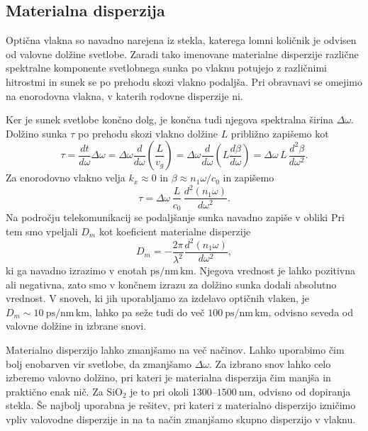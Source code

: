 \subsection*{Materialna disperzija}
Optična vlakna so navadno narejena iz stekla, katerega lomni količnik je odvisen 
od valovne dolžine svetlobe. Zaradi tako imenovane materialne disperzije različne 
spektralne komponente svetlobnega sunka po vlaknu potujejo z različnimi hitrostmi 
in sunek se po prehodu skozi vlakno podaljša. Pri obravnavi 
se omejimo na enorodovna vlakna, v katerih rodovne disperzije ni. 

Ker je sunek svetlobe končno dolg, je končna tudi njegova spektralna širina 
$\Delta \omega$. 
Dolžino sunka $\tau$ po prehodu skozi vlakno dolžine $L$ približno zapišemo kot
\begin{equation}
\tau = \frac{dt}{d\omega}\Delta \omega = 
\Delta \omega \frac{d}{d\omega}\left(\frac{L}{v_g}\right)
= \Delta \omega \frac{d}{d\omega}\left(L \frac{d\beta}{d\omega}\right) =
\Delta \omega\, L\, \frac{d^2 \beta}{d \omega^2}.
\label{dispračun}
\end{equation}
Za enorodovno vlakno velja $k_x \approx 0$ in $\beta \approx n_1 \omega/c_0$ in zapišemo  
\begin{equation}
\tau = \Delta \omega\, \frac{L}{c_0}\,\frac{d^2 (n_1 \omega)}{d \omega^2}.
\end{equation}
Na področju telekomunikacij se podaljšanje sunka navadno zapiše v obliki
Pri tem smo vpeljali $D_m$ kot koeficient materialne disperzije
\begin{equation}
D_m = - \frac{2\pi}{\lambda^2}\frac{d^2(n_1\omega)}{d\omega^2},
\end{equation}
ki ga navadno izrazimo v enotah $\si{\pico\second/\nano\meter\, \kilo\meter}$.
Njegova vrednost je lahko pozitivna ali negativna, zato smo v končnem izrazu za dolžino 
sunka dodali absolutno vrednost. V snoveh, ki jih uporabljamo za izdelavo optičnih vlaken, 
je $D_m \sim 10~\si{\pico\second/\nano\meter\, \kilo\meter}$, lahko pa seže
tudi do več $100~\si{\pico\second/\nano\meter\, \kilo\meter}$, odvisno seveda od valovne dolžine
in izbrane snovi.

Materialno disperzijo lahko zmanjšamo na več načinov. Lahko uporabimo čim bolj enobarven
vir svetlobe, da zmanjšamo $\Delta \omega$. Za izbrano snov lahko celo izberemo valovno 
dolžino, pri kateri je materialna disperzija čim manjša in praktično enak nič. Za 
SiO$_2$ je to pri okoli $1300$--$1500~\si{\nano\meter}$, odvisno 
od dopiranja stekla. Še najbolj uporabna je rešitev, pri kateri 
z materialno disperzijo izničimo vpliv valovodne disperzije in na ta način zmanjšamo skupno 
disperzijo v vlaknu.

